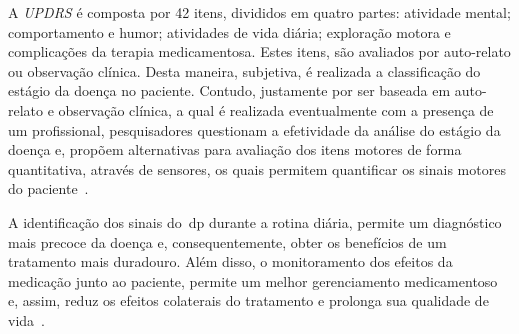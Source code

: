A \textit{UPDRS} é composta por 42 itens, divididos em quatro partes: atividade mental; comportamento e humor; atividades de vida diária; exploração motora e complicações da terapia medicamentosa. Estes itens, são avaliados por auto-relato ou observação clínica. Desta maneira, subjetiva, é realizada a classificação do estágio da doença no paciente. Contudo, justamente por ser baseada em auto-relato e observação clínica, a qual é realizada eventualmente com a presença de um profissional, pesquisadores questionam a efetividade da análise do estágio da doença e, propõem alternativas para avaliação dos itens motores de forma quantitativa, através de sensores, os quais permitem quantificar os sinais motores do paciente~\cite{kostek12,synnott_wiipd_2012,patel_monitoring_2009}.


A identificação dos sinais do~\ac{dp} durante a rotina diária, permite um diagnóstico mais precoce da doença e, consequentemente, obter os benefícios de um tratamento mais duradouro. Além disso, o monitoramento dos efeitos da medicação junto ao paciente, permite um melhor gerenciamento medicamentoso e, assim, reduz os efeitos colaterais do tratamento e prolonga sua qualidade de vida~\cite{rowlandtratado}.


